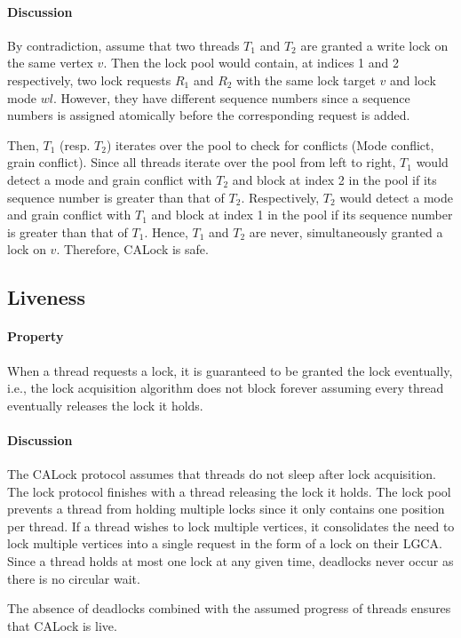 \paragraph{Discussion} By contradiction, assume that two threads $T_1$ and $T_2$ are granted a write lock on the same vertex $v$. 
Then the lock pool would contain, at indices 1 and 2 respectively, two lock requests $R_1$ and $R_2$ with the same lock target $v$ and lock mode $wl$. However, they have different sequence numbers since a sequence numbers is assigned atomically before the corresponding request is added.

Then, $T_1$ (resp. $T_2$) iterates over the pool to check for conflicts (Mode conflict, grain conflict). 
Since all threads iterate over the pool from left to right, $T_1$ would detect a mode and grain conflict with $T_2$ and block at index 2 in the pool if its sequence number is greater than that of $T_2$. Respectively, $T_2$ would detect a mode and grain conflict with $T_1$ and block at index 1 in the pool if its sequence number is greater than that of $T_1$.
Hence, $T_1$ and $T_2$ are never, simultaneously granted a lock on $v$. Therefore, CALock is safe.

\subsection[Liveness]{Liveness}
\paragraph{Property} When a thread requests a lock, it is guaranteed to be granted the lock eventually, i.e., 
the lock acquisition algorithm does not block forever assuming every thread eventually releases the lock it holds.

\paragraph{Discussion}
The CALock protocol assumes that threads do not sleep after lock acquisition. The lock protocol finishes with a thread releasing the lock it holds. The lock pool prevents a thread from holding multiple locks since it only contains one position per thread. 
If a thread wishes to lock multiple vertices, it consolidates the need to lock multiple vertices into a single request in the form of a lock on their LGCA. 
Since a thread holds at most one lock at any given time, deadlocks never occur as there is no circular wait.

The absence of deadlocks combined with the assumed progress of threads ensures that CALock is live. 

